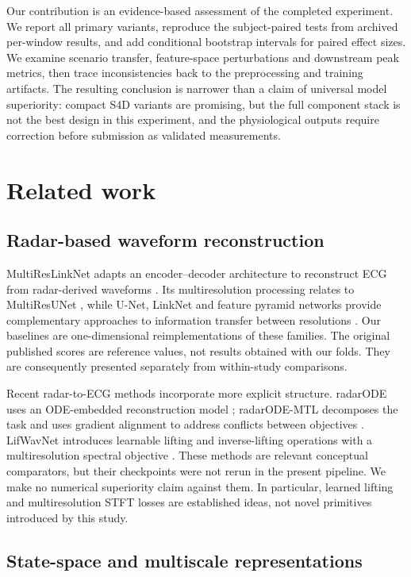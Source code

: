 \documentclass[11pt,a4paper]{article}
\begin{document}
Our contribution is an evidence-based assessment of the completed experiment. We report all
primary variants, reproduce the subject-paired tests from archived per-window results, and add
conditional bootstrap intervals for paired effect sizes. We examine scenario transfer,
feature-space perturbations and downstream peak metrics, then trace inconsistencies back to
the preprocessing and training artifacts. The resulting conclusion is narrower than a claim
of universal model superiority: compact S4D variants are promising, but the full component stack
is not the best design in this experiment, and the physiological outputs require correction
before submission as validated measurements.

\section{Related work}

\subsection{Radar-based waveform reconstruction}

MultiResLinkNet adapts an encoder--decoder architecture to reconstruct ECG from radar-derived
waveforms \citep{chowdhury2024}. Its multiresolution processing relates to MultiResUNet
\citep{multiresunet}, while U-Net, LinkNet and feature pyramid networks provide complementary
approaches to information transfer between resolutions \citep{unet,linknet,fpn}. Our baselines
are one-dimensional reimplementations of these families. The original published scores are
reference values, not results obtained with our folds. They are consequently presented
separately from within-study comparisons.

Recent radar-to-ECG methods incorporate more explicit structure. radarODE uses an
ODE-embedded reconstruction model \citep{radarode}; radarODE-MTL decomposes the task and uses
gradient alignment to address conflicts between objectives \citep{radarodemt}. LifWavNet
introduces learnable lifting and inverse-lifting operations with a multiresolution spectral
objective \citep{lifwavnet}. These methods are relevant conceptual comparators, but their
checkpoints were not rerun in the present pipeline. We make no numerical superiority claim
against them. In particular, learned lifting and multiresolution STFT losses are established
ideas, not novel primitives introduced by this study.

\subsection{State-space and multiscale representations}
\end{document}
